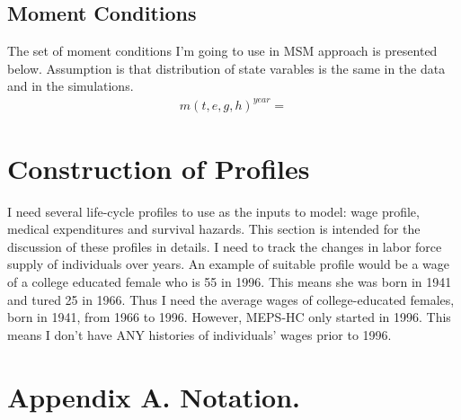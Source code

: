 \documentclass[
10pt, %
a4paper, %
oneside, %
headinclude,footinclude, %
BCOR5mm, %
]{scrartcl}
\begin{document}
\subsection{Moment Conditions}
The set of moment conditions I'm going to use in MSM approach is presented below. Assumption is that distribution of state varables is the same in the data and in the simulations.
\begin{eqnarray}
m(t,e,g,h)^{year} = 
\end{eqnarray}


\section{Construction of Profiles}
I need several life-cycle profiles to use as the inputs to model: wage profile, medical expenditures and survival hazards. This section is intended for the discussion of these profiles in details.
I need to track the changes in labor force supply of individuals over years. An example of suitable profile would be a wage of a college educated female who is 55 in 1996. This means she was born in 1941 and tured 25 in 1966. Thus I need the average wages of college-educated females, born in 1941, from 1966 to 1996. However, MEPS-HC only started in 1996. This means I don't have  ANY histories of individuals' wages prior to 1996.


\section{Appendix A. Notation.}
\end{document}
